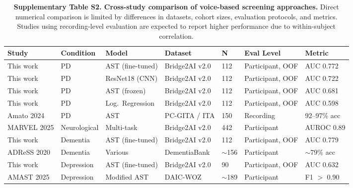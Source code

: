 \documentclass[11pt,a4paper]{article}
\begin{document}
\begin{table}[H]
\centering
\caption{\textbf{Supplementary Table S2. Cross-study comparison of voice-based screening approaches.} Direct numerical comparison is limited by differences in datasets, cohort sizes, evaluation protocols, and metrics. Studies using recording-level evaluation are expected to report higher performance due to within-subject correlation.}
\label{tab:crossstudy}
\vspace{0.5em}
\small
\begin{tabular}{L{2.2cm} L{1.8cm} L{2cm} L{2.2cm} C{0.8cm} L{1.8cm} L{1.8cm}}
\toprule
\textbf{Study} & \textbf{Condition} & \textbf{Model} & \textbf{Dataset} & \textbf{N} & \textbf{Eval Level} & \textbf{Metric} \\
\midrule
This work & PD & AST (fine-tuned) & Bridge2AI v2.0 & 112 & Participant, OOF & AUC 0.772 \\
This work & PD & ResNet18 (CNN) & Bridge2AI v2.0 & 112 & Participant, OOF & AUC 0.722 \\
This work & PD & AST (frozen) & Bridge2AI v2.0 & 112 & Participant, OOF & AUC 0.681 \\
This work & PD & Log.\ Regression & Bridge2AI v2.0 & 112 & Participant, OOF & AUC 0.598 \\
Amato 2024 & PD & AST & PC-GITA / ITA & 150 & Recording & 92--97\% acc \\
MARVEL 2025 & Neurological & Multi-task & Bridge2AI v2.0 & 442 & Participant & AUROC 0.89 \\
\midrule
This work & Dementia & AST (fine-tuned) & Bridge2AI v2.0 & 112 & Participant, OOF & AUC 0.779 \\
ADReSS 2020 & Dementia & Various & DementiaBank & $\sim$156 & Participant & $\sim$79\% acc \\
\midrule
This work & Depression & AST (fine-tuned) & Bridge2AI v2.0 & 90 & Participant, OOF & AUC 0.632 \\
AMAST 2025 & Depression & Modified AST & DAIC-WOZ & $\sim$189 & Participant & F1 $>$ 0.90 \\
\bottomrule
\end{tabular}
\end{table}

\vspace{2em}
\end{document}
